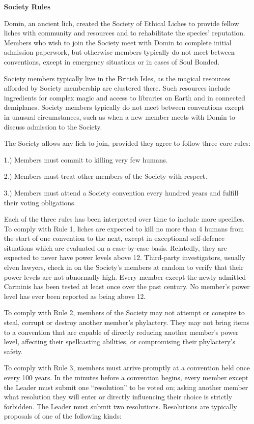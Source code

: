 \documentclass[blue]{Sel}
\begin{document}
\name{\bSociety{}}
\textbf{Society Rules}

Domin, an ancient lich, created the Society of Ethical Liches to provide fellow liches with community and resources and to rehabilitate the species' reputation. Members who wish to join the Society meet with Domin to complete initial admission paperwork, but otherwise members typically do not meet between conventions, except in emergency situations or in cases of Soul Bonded.

Society members typically live in the British Isles, as the magical resources afforded by Society membership are clustered there. Such resources include ingredients for complex magic and access to libraries on Earth and in connected demiplanes.  Society members typically do not meet between conventions except in unusual circumstances, such as when a new member meets with Domin to discuss admission to the Society.

The Society allows any lich to join, provided they agree to follow three core rules:

1.) Members must commit to killing very few humans.
 
2.) Members must treat other members of the Society with respect.

3.) Members must attend a Society convention every hundred years and fulfill their voting obligations.

Each of the three rules has been interpreted over time to include more specifics. To comply with Rule 1, liches are expected to kill no more than 4 humans from the start of one convention to the next, except in exceptional self-defence situations which are evaluated on a case-by-case basis. Relatedly, they are expected to never have power levels above 12. Third-party investigators, usually elven lawyers, check in on the Society's members at random to verify that their power levels are not abnormally high. Every member except the newly-admitted Carminis has been tested at least once over the past century. No member's power level has ever been reported as being above 12.

To comply with Rule 2, members of the Society may not attempt or conspire to steal, corrupt or destroy another member's phylactery. They may not bring items to a convention that are capable of directly reducing another member's power level, affecting their spellcasting abilities, or compromising their phylactery's safety.

To comply with Rule 3, members must arrive promptly at a convention held once every 100 years. In the minutes before a convention begins, every member except the Leader must submit one “resolution” to be voted on; asking another member what resolution they will enter or directly influencing their choice is strictly forbidden. The Leader must submit two resolutions. Resolutions are typically proposals of one of the following kinds:
\end{document}
